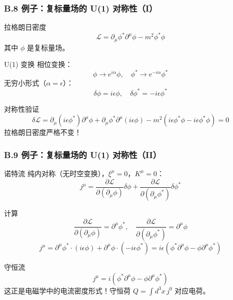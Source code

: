 \documentclass[xcolor=dvipsnames]{ctexbeamer}
\begin{document}
\begin{frame}
\frametitle{B.8 例子：复标量场的 U(1) 对称性（I）}
\begin{block}{拉格朗日密度}
$$\mathcal{L} = \partial_\mu\phi^*\partial^\mu\phi - m^2\phi^*\phi$$
其中 $\phi$ 是复标量场。
\end{block}

\pause

\begin{block}{U(1) 变换}
相位变换：
$$\phi \to e^{i\alpha}\phi, \quad \phi^* \to e^{-i\alpha}\phi^*$$
无穷小形式（$\alpha = \epsilon$）：
$$\delta\phi = i\epsilon\phi, \quad \delta\phi^* = -i\epsilon\phi^*$$
\end{block}

\pause

\begin{block}{对称性验证}
$$\delta\mathcal{L} = \partial_\mu(i\epsilon\phi^*)\partial^\mu\phi + \partial_\mu\phi^*\partial^\mu(i\epsilon\phi) - m^2(i\epsilon\phi^*\phi - i\epsilon\phi^*\phi) = 0$$
拉格朗日密度严格不变！
\end{block}
\end{frame}

\begin{frame}
\frametitle{B.9 例子：复标量场的 U(1) 对称性（II）}
\begin{block}{诺特流}
纯内对称（无时空变换），$\xi^\mu = 0$，$K^\mu = 0$：
$$j^\mu = \frac{\partial\mathcal{L}}{\partial(\partial_\mu\phi)}\delta\phi + \frac{\partial\mathcal{L}}{\partial(\partial_\mu\phi^*)}\delta\phi^*$$
\end{block}

\pause

\begin{block}{计算}
$$\frac{\partial\mathcal{L}}{\partial(\partial_\mu\phi)} = \partial^\mu\phi^*, \quad \frac{\partial\mathcal{L}}{\partial(\partial_\mu\phi^*)} = \partial^\mu\phi$$
$$j^\mu = \partial^\mu\phi^* \cdot (i\epsilon\phi) + \partial^\mu\phi \cdot (-i\epsilon\phi^*) = i\epsilon(\phi^*\partial^\mu\phi - \phi\partial^\mu\phi^*)$$
\end{block}

\pause

\begin{alertblock}{守恒流}
$$\boxed{j^\mu = i(\phi^*\partial^\mu\phi - \phi\partial^\mu\phi^*)}$$
这正是电磁学中的电流密度形式！守恒荷 $Q = \int d^3x \, j^0$ 对应电荷。
\end{alertblock}
\end{frame}
\end{document}
